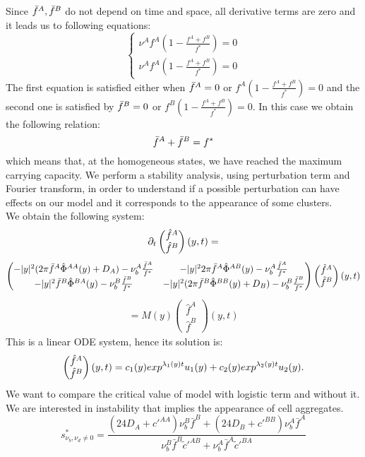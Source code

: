 Since ${\bar{f}^A},{\bar{f}^B}$ do not depend on time and space, all derivative terms are zero and it leads us to following equations:
$$
\begin{cases}
	\nu^{A}f^A\left( 1-\frac{f^A+f^B}{f^{*}} \right)=0 \\
	\nu^{A}f^A\left( 1-\frac{f^A+f^B}{f^{*}} \right)=0
\end{cases}
$$
The first equation is satisfied either when ${\bar{f}^A}=0$ or $f^A\left( 1-\frac{f^A+f^B}{f^{*}} \right)=0$ and the second one is satisfied by ${\bar{f}^B}=0$ or $f^B\left( 1-\frac{f^A+f^B}{f^{*}} \right)=0$. In this case we obtain the following relation:  
$$ {\bar{f}^A}+{\bar{f}^B}=f^* $$
which means that, at the homogeneous states, we have reached the maximum carrying capacity. 
We perform a stability analysis, using perturbation term and Fourier transform, in order to understand if a possible perturbation can have effects on our model and it corresponds to the appearance of some clusters. \\
We obtain the following system:
\begin{align}
{\partial}_t \begin{pmatrix} \hat{f}^A \\ \hat{f}^B
\end{pmatrix}(y,t)=
\end{align}
\begin{align}
\begin{pmatrix} -|y|^2(2\pi{\bar{f}^A}{\hat{\Phi}^{AA}}(y)+D_A)-\nu_{b}^A\frac{{\bar{f}^A}}{f^*} & -|y|^22\pi{\bar{f}^A}{\hat{\Phi}^{AB}}(y)-\nu_{b}^A\frac{{\bar{f}^A}}{f^*} \\ 
-|y|^2{\bar{f}^B}{\hat{\Phi}^{BA}}(y)-\nu_{b}^B\frac{{\bar{f}^B}}{f^*} & -|y|^2(2\pi{\bar{f}^B}{\hat{\Phi}^{BB}}(y)+D_B)-\nu_{b}^B\frac{{\bar{f}^B}}{f^*} 
\end{pmatrix}
\begin{pmatrix} \hat{f}^A \\ \hat{f}^B
\end{pmatrix}(y,t)
\end{align}
\begin{align}
=M(y)\begin{pmatrix} \hat{f}^A \\ \hat{f}^B
\end{pmatrix}(y,t)
\end{align}
This is a linear ODE system, hence its solution is:
$$
\begin{pmatrix} \hat{f}^A \\ \hat{f}^B
\end{pmatrix}(y,t)=c_1(y)exp^{{\lambda}_1(y)t}u_1(y)+c_2(y)exp^{{\lambda}_2(y)t}u_2(y).
$$
We want to compare the critical value of model with logistic term and without it. We are interested in instability  that implies the appearance of cell aggregates.
\begin{equation}
s^{*}_{\nu_b,\nu_d \ne 0}=\frac{(24 D_A+c'^{AA})\nu_{b}^{B}\bar{f}^{B}+(24 D_B+c'^{BB})\nu_{b}^{A}\bar{f}^A}{\nu_{b}^{B}\bar{f}^B\tilde{c}'^{AB}+\nu_{b}^{A}\bar{f}^A\tilde{c}'^{BA}}
\end{equation}


